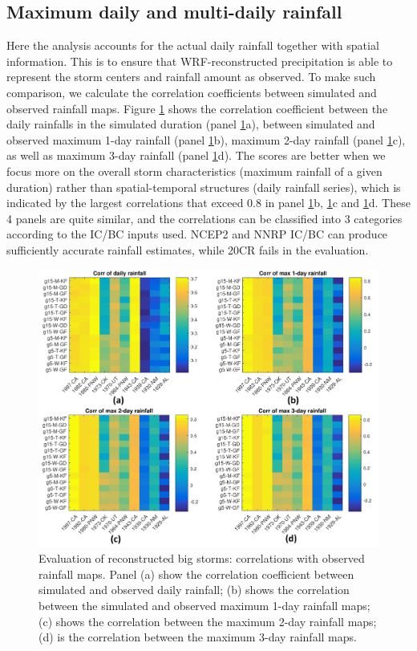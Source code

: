 \subsection{Maximum daily and multi-daily rainfall}

Here the analysis accounts for the actual daily rainfall together with spatial information. This is to ensure that WRF-reconstructed precipitation is able to represent the storm centers and rainfall amount as observed. To make such comparison, we calculate the correlation coefficients between simulated and observed rainfall maps. Figure \ref{fig:3-3} shows the correlation coefficient between the daily rainfalls in the simulated duration (panel \ref{fig:3-3}a), between simulated and observed maximum 1-day rainfall (panel \ref{fig:3-3}b), maximum 2-day rainfall (panel \ref{fig:3-3}c), as well as maximum 3-day rainfall (panel \ref{fig:3-3}d). The scores are better when we focus more on the overall storm characteristics (maximum rainfall of a given duration) rather than spatial-temporal structures (daily rainfall series), which is indicated by the largest correlations that exceed 0.8 in panel \ref{fig:3-3}b, \ref{fig:3-3}c and \ref{fig:3-3}d. These 4 panels are quite similar, and the correlations can be classified into 3 categories according to the IC/BC inputs used. NCEP2 and NNRP IC/BC can produce sufficiently accurate rainfall estimates, while 20CR fails in the evaluation.

\begin{figure}[htbp]
	\includegraphics[width=\linewidth]{pics/ch3/fig3.jpg}
	\caption{Evaluation of reconstructed big storms: correlations with observed rainfall maps. Panel (a) show the correlation coefficient between simulated and observed daily rainfall; (b) shows the correlation between the simulated and observed maximum 1-day rainfall maps; (c) shows the correlation between the maximum 2-day rainfall maps; (d) is the correlation between the maximum 3-day rainfall maps.}
	\label{fig:3-3}
\end{figure}

